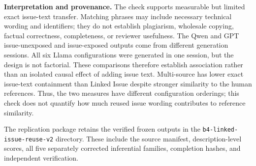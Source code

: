 \documentclass[11pt,a4paper]{article}
\begin{document}
\textbf{Interpretation and provenance.}
The check supports measurable but limited exact issue-text transfer. Matching phrases may include necessary technical wording and identifiers; they do not establish plagiarism, wholesale copying, factual correctness, completeness, or reviewer usefulness. The Qwen and GPT issue-unexposed and issue-exposed outputs come from different generation sessions. All six Llama configurations were generated in one session, but the design is not factorial. These comparisons therefore establish association rather than an isolated causal effect of adding issue text. Multi-source has lower exact issue-text containment than Linked Issue despite stronger similarity to the human references. Thus, the two measures have different configuration orderings; this check does not quantify how much reused issue wording contributes to reference similarity.

The replication package retains the verified frozen outputs in the \texttt{b4-linked-issue-}\allowbreak\texttt{reuse-v2} directory. These include the source manifest, description-level scores, all five separately corrected inferential families, completion hashes, and independent verification.
\end{document}
